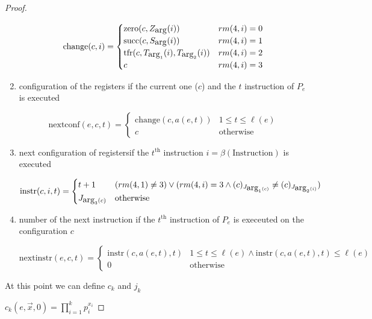 \begin{theorem}
\begin{proof}
\begin{enumerate}[label=(\alph*)]
      \newcommand{\change}{\mbox{change}}
      \[
        \change(c,i) = \begin{cases}
          \mbox{zero}(c, Z_\uarg(i)) & rm(4,i) = 0 \\
          \mbox{succ}(c, S_\uarg(i)) & rm(4,i) = 1 \\
          \mbox{tfr}(c, T_{\uarg_1}(i), T_{\uarg_2}(i)) & rm(4,i) = 2 \\
          c & rm(4,i) = 3
      \end{cases} 
    \]

  \item configuration of the registers if the current one ($c$) and
    the $t$ instruction of $P_e$ is executed

    \newcommand{\nextconf}{\mbox{nextconf}}
    \[
      \nextconf(e,c,t) = \begin{cases}
        \change(c, a(e,t)) & 1 \leq t \leq \ell(e) \\
        c & \mbox{otherwise}
      \end{cases}
    \]

  \item next configuration of registersif the $t^{\mbox{th}}$
    instruction $i=\beta(\mbox{Instruction})$ is executed

    \newcommand{\instr}{\mbox{instr}}
    \[
      \instr(c, i, t) = \begin{cases}

        t+1 & (rm(4,1) \neq 3) \vee (rm(4,i) = 3 \wedge (c)_{J_{\uarg_1(c)}} \neq (c)_{J_{\uarg_2(i)}}) \\
        J_{\uarg_3(c)} & \mbox{otherwise}
      \end{cases}
    \]

  \item number of the next instruction if the $t^{\mbox{th}}$
    instruction of $P_e$ is execeuted on the configuration $c$

    \newcommand{\nextinstr}{\mbox{nextinstr}}
    \[
      \nextinstr(e,c,t) = \begin{cases}
        \instr(c, a(e,t), t) & 1 \leq t \leq \ell(e) \wedge \instr(c, a(e,t), t) \leq \ell(e) \\
        0 & \mbox{otherwise}
      \end{cases}
    \]
  \end{enumerate}

  At this point we can define $c_k$ and $j_k$

  $c_k(e, \vec{x}, 0) = \prod_{i=1}^kp_i^{x_i}$


\end{proof}
\end{theorem}
